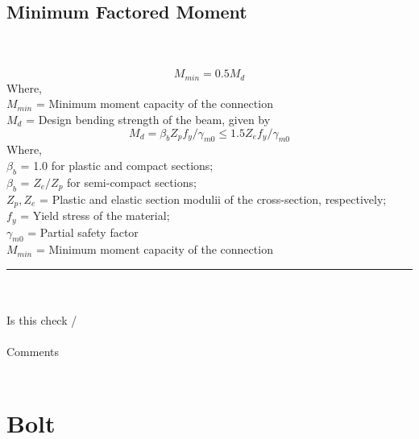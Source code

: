 \documentclass[11.5pt,a4paper,oneside]{report}
\newcommand{\okornot}{ \vspace{15mm} \hrule
	\noindent \\ \\
	Is this check \qquad
	\CheckBox[checked=False, name= ok]{\textbf{Ok}} \qquad / 
	\CheckBox[checked=False, name= notok]{\textbf{Not Ok}}\\ \\
	Comments \\ \\
	\noindent
	\TextField[name=multilinetextbox, multiline=true, width=1.0\linewidth,height=2in]{}}
\begin{document}
\begin{Form}
\section{Minimum Factored Moment} 
\qquad \qquad[Reference: Cl. 10.7, b-1, IS 800 : 2007] \\ \\
	\begin{equation}\label{eq:cl_10.7b, IS 800}
		M_{min} = 0.5 M_d 
	\end{equation}
	Where, \\
		\indent $M_{min}$ = Minimum moment capacity of the connection \\
		\indent $M_d$ = Design bending strength of the beam, given by
	\begin{equation} \label{eq:cl_8.2.1.2a, IS 800}
		M_d = \beta_b Z_p f_y / \gamma_{m0} \le 1.5 Z_e f_y / \gamma_{m0} 
	\end{equation}
	Where, \\
		\indent $\beta_b$ = 1.0 for plastic and compact sections;\\
		\indent $\beta_b$ = $Z_e/Z_p$ for semi-compact sections;\\
		
		
		\indent $Z_p, Z_e$ = Plastic and elastic section modulii of the cross-section, respectively; \\
		\indent $f_y$ = Yield stress of the material;\\
		\indent $\gamma_{m0}$ = Partial safety factor \\
		\indent $M_{min}$ = Minimum moment capacity of the connection

\okornot

\chapter{Bolt}
%

\end{Form}
\end{document}
